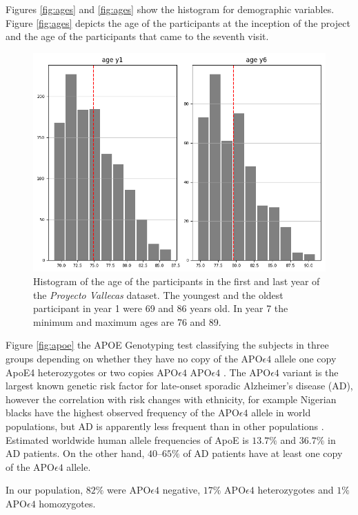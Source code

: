 \documentclass[11pt]{article}
\theoremstyle{definition}
\theoremstyle{remark}
\begin{document}
Figures \ref{fig:ages} and \ref{fig:ages} show the histogram for demographic variables. Figure \ref{fig:ages} depicts the age of the participants at the inception of the project and the age of the participants that came to the seventh visit.

\begin{figure}[H]
        \centering
        \includegraphics[keepaspectratio, width=0.5\linewidth]{figures/Fig_ages}
        \caption{Histogram of the age of the participants in the first and last year of the \emph{Proyecto Vallecas} dataset. The youngest and the oldest participant in year 1 were 69 and 86 years old. In year 7 the minimum and maximum ages are 76 and 89.} 
        \label{fig:anthro}
\end{figure}


Figure \ref{fig:apoe} the APOE Genotyping test classifying the subjects in three groups depending on whether they have no copy of the APO$\epsilon4$ allele one copy ApoE4 heterozygotes or two copies APO$\epsilon4$ APO$\epsilon4$ \cite{farrer1997effects}. The APO$\epsilon4$ variant is the largest known genetic risk factor for late-onset sporadic Alzheimer's disease (AD), however the correlation with risk changes with ethnicity, for example Nigerian blacks have the highest observed frequency of the APO$\epsilon4$ allele in world populations, but AD is apparently less frequent than in other populations \cite{sepehrnia1989genetic}.
Estimated worldwide human allele frequencies of ApoE is $13.7\%$ and $36.7\%$ in AD patients. On the other hand, $40–65\%$ of AD patients have at least one copy of the APO$\epsilon4$ allele.

In our population, $82\%$ were APO$\epsilon4$ negative, $17\%$ APO$\epsilon4$ heterozygotes and $1\%$ APO$\epsilon4$ homozygotes. 
\end{document}
